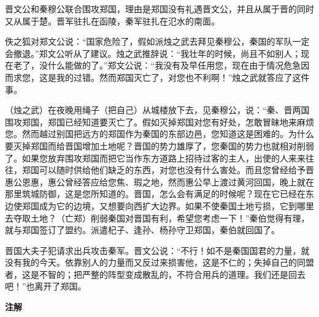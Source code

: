 \documentclass[12pt,UTF-8,openany,a4]{ctexbook}
\begin{document}
\begin{large}
    \yiwen 
    晋文公和秦穆公联合围攻郑国，理由是郑国没有礼遇晋文公，并且从属于晋的同时又从属于楚。晋军驻扎在函陵，秦军驻扎在氾水的南面。
    
    佚之狐对郑文公说：“国家危险了，假如派烛之武去拜见秦穆公，秦国的军队一定会撤退。”郑文公听从了建议。烛之武推辞说：“我壮年的时候，尚且不如别人；现在老了，没什么能做的了。”郑文公说：“我没有及早任用您，现在由于情况危急因而求您，这是我的过错。然而郑国灭亡了，对您也不利啊！”烛之武就答应了这件事。
    
    （烛之武）在夜晚用绳子（把自己）从城楼放下去，见秦穆公，说：“秦、晋两国围攻郑国，郑国已经知道要灭亡了。假如灭掉郑国对您有好处，怎敢冒昧地来麻烦您。然而越过别国把远方的郑国作为秦国的东部边邑，您知道这是困难的。为什么要灭掉郑国而给晋国增加土地呢？晋国的势力雄厚了，您秦国的势力也就相对削弱了。如果您放弃围攻郑国而把它当作东方道路上招待过客的主人，出使的人来来往往，郑国可以随时供给他们缺乏的东西，对您也没有什么害处。而且您曾经给予晋惠公恩惠，惠公曾经答应给您焦、瑕之地，然而惠公早上渡过黄河回国，晚上就在那里筑城防御，这是您所知道的。晋国，怎么会有满足的时候呢？现在它已经在东边使郑国成为它的边境，又想要向西扩大边界。如果不使秦国土地亏损，它到哪里去夺取土地？（亡郑）削弱秦国对晋国有利，希望您考虑一下！”秦伯觉得有理，就与郑国签订了盟约。派遣杞子、逢孙、杨孙守卫郑国，秦伯就回国了。
    
    晋国大夫子犯请求出兵攻击秦军。晋文公说：“不行！如不是秦国国君的力量，就没有我的今天。依靠别人的力量而又反过来损害他，这是不仁的；失掉自己的同盟者，这是不智的；把严整的阵型变成散乱的，不符合用兵的道理。我们还是回去吧！”也离开了郑国。
    
\end{large}


\newpage

\begin{Large}
    \noindent\textbf{注解}
\end{Large}


\vspace{-1em}
\end{document}
